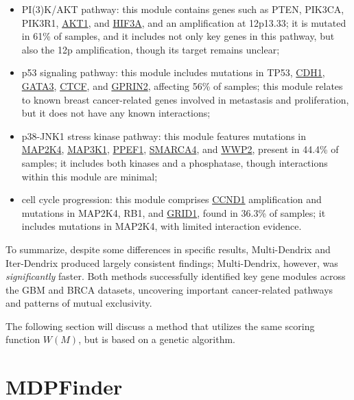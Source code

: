 \begin{itemize}
    \item PI(3)K/AKT pathway: this module contains genes such as PTEN, PIK3CA, PIK3R1, \href{https://www.ncbi.nlm.nih.gov/gene/207}{AKT1}, and \href{https://www.ncbi.nlm.nih.gov/gene/64344}{HIF3A}, and an amplification at 12p13.33; it is mutated in 61\% of samples, and it includes not only key genes in this pathway, but also the 12p amplification, though its target remains unclear;
    \item p53 signaling pathway: this module includes mutations in TP53, \href{https://www.ncbi.nlm.nih.gov/gene/999}{CDH1}, \href{https://www.ncbi.nlm.nih.gov/gene/2625}{GATA3}, \href{https://www.ncbi.nlm.nih.gov/gene/10664}{CTCF}, and \href{https://www.ncbi.nlm.nih.gov/gene/9721}{GPRIN2}, affecting 56\% of samples; this module relates to known breast cancer-related genes involved in metastasis and proliferation, but it does not have any known interactions;
    \item p38-JNK1 stress kinase pathway: this module features mutations in \href{https://www.ncbi.nlm.nih.gov/gene/6416}{MAP2K4}, \href{https://www.ncbi.nlm.nih.gov/gene/4214}{MAP3K1}, \href{https://www.ncbi.nlm.nih.gov/gene/5475}{PPEF1}, \href{https://www.ncbi.nlm.nih.gov/gene/6597}{SMARCA4}, and \href{https://www.ncbi.nlm.nih.gov/gene/11060}{WWP2}, present in 44.4\% of samples; it includes both kinases and a phosphatase, though interactions within this module are minimal;
    \item cell cycle progression: this module comprises \href{https://www.ncbi.nlm.nih.gov/gene/595}{CCND1} amplification and mutations in MAP2K4, RB1, and \href{https://www.ncbi.nlm.nih.gov/gene/2894}{GRID1}, found in 36.3\% of samples; it includes mutations in MAP2K4, with limited interaction evidence.
\end{itemize}

To summarize, despite some differences in specific results, Multi-Dendrix and Iter-Dendrix produced largely consistent findings; Multi-Dendrix, however, was \textit{significantly} faster. Both methods successfully identified key gene modules across the GBM and BRCA datasets, uncovering important cancer-related pathways and patterns of mutual exclusivity.

The following section will discuss a method that utilizes the same scoring function $W(M)$, but is based on a genetic algorithm.

\section{MDPFinder}


